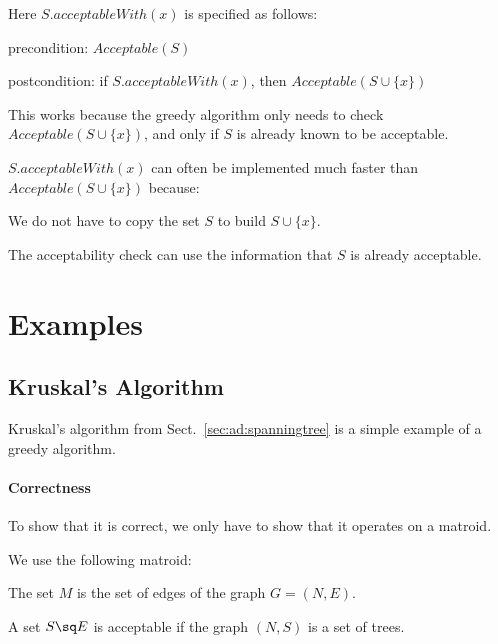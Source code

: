 Here $S.acceptableWith(x)$ is specified as follows:
\begin{compactitem}
 \item precondition: $Acceptable(S)$
 \item postcondition: if $S.acceptableWith(x)$, then $Acceptable(S\cup\{x\})$
\end{compactitem}
This works because the greedy algorithm only needs to check $Acceptable(S\cup\{x\})$, and only if $S$ is already known to be acceptable.

$S.acceptableWith(x)$ can often be implemented much faster than $Acceptable(S\cup\{x\})$ because:
\begin{compactitem}
 \item We do not have to copy the set $S$ to build $S\cup\{x\}$.
 \item The acceptability check can use the information that $S$ is already acceptable.
\end{compactitem}

\section{Examples}

\subsection{Kruskal's Algorithm}

Kruskal's algorithm from Sect.~\ref{sec:ad:spanningtree} is a simple example of a greedy algorithm.

\paragraph{Correctness}
To show that it is correct, we only have to show that it operates on a matroid.

We use the following matroid:
\begin{compactitem}
 \item The set $M$ is the set of edges of the graph $G=(N,E)$.
 \item A set $S\sq E$ is acceptable if the graph $(N,S)$ is a set of trees.
\end{compactitem}

